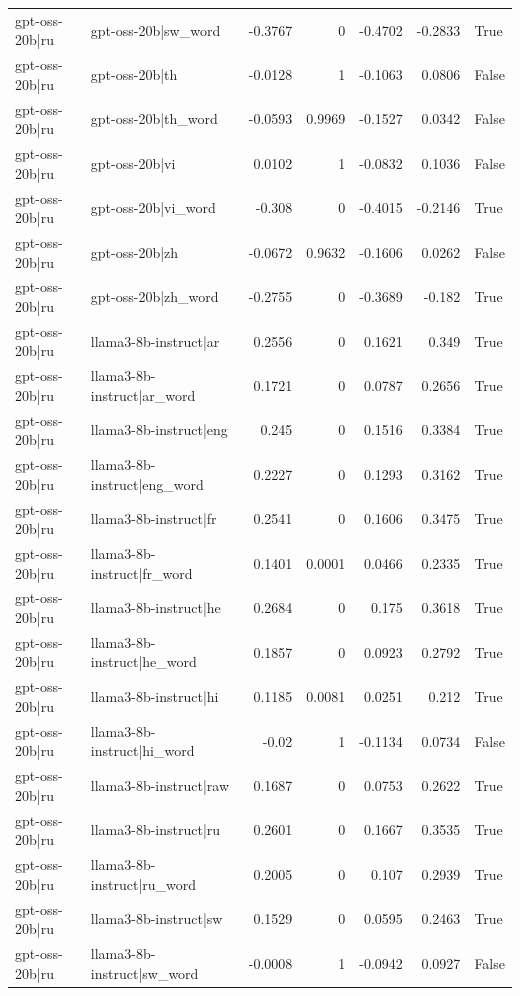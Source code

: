 \begin{table}
\begin{tabular}{l l r r r r l}
gpt-oss-20b|ru & gpt-oss-20b|sw_word & -0.3767 & 0 & -0.4702 & -0.2833 & True \\
gpt-oss-20b|ru & gpt-oss-20b|th & -0.0128 & 1 & -0.1063 & 0.0806 & False \\
gpt-oss-20b|ru & gpt-oss-20b|th_word & -0.0593 & 0.9969 & -0.1527 & 0.0342 & False \\
gpt-oss-20b|ru & gpt-oss-20b|vi & 0.0102 & 1 & -0.0832 & 0.1036 & False \\
gpt-oss-20b|ru & gpt-oss-20b|vi_word & -0.308 & 0 & -0.4015 & -0.2146 & True \\
gpt-oss-20b|ru & gpt-oss-20b|zh & -0.0672 & 0.9632 & -0.1606 & 0.0262 & False \\
gpt-oss-20b|ru & gpt-oss-20b|zh_word & -0.2755 & 0 & -0.3689 & -0.182 & True \\
gpt-oss-20b|ru & llama3-8b-instruct|ar & 0.2556 & 0 & 0.1621 & 0.349 & True \\
gpt-oss-20b|ru & llama3-8b-instruct|ar_word & 0.1721 & 0 & 0.0787 & 0.2656 & True \\
gpt-oss-20b|ru & llama3-8b-instruct|eng & 0.245 & 0 & 0.1516 & 0.3384 & True \\
gpt-oss-20b|ru & llama3-8b-instruct|eng_word & 0.2227 & 0 & 0.1293 & 0.3162 & True \\
gpt-oss-20b|ru & llama3-8b-instruct|fr & 0.2541 & 0 & 0.1606 & 0.3475 & True \\
gpt-oss-20b|ru & llama3-8b-instruct|fr_word & 0.1401 & 0.0001 & 0.0466 & 0.2335 & True \\
gpt-oss-20b|ru & llama3-8b-instruct|he & 0.2684 & 0 & 0.175 & 0.3618 & True \\
gpt-oss-20b|ru & llama3-8b-instruct|he_word & 0.1857 & 0 & 0.0923 & 0.2792 & True \\
gpt-oss-20b|ru & llama3-8b-instruct|hi & 0.1185 & 0.0081 & 0.0251 & 0.212 & True \\
gpt-oss-20b|ru & llama3-8b-instruct|hi_word & -0.02 & 1 & -0.1134 & 0.0734 & False \\
gpt-oss-20b|ru & llama3-8b-instruct|raw & 0.1687 & 0 & 0.0753 & 0.2622 & True \\
gpt-oss-20b|ru & llama3-8b-instruct|ru & 0.2601 & 0 & 0.1667 & 0.3535 & True \\
gpt-oss-20b|ru & llama3-8b-instruct|ru_word & 0.2005 & 0 & 0.107 & 0.2939 & True \\
gpt-oss-20b|ru & llama3-8b-instruct|sw & 0.1529 & 0 & 0.0595 & 0.2463 & True \\
gpt-oss-20b|ru & llama3-8b-instruct|sw_word & -0.0008 & 1 & -0.0942 & 0.0927 & False \\

\end{tabular}
\end{table}
